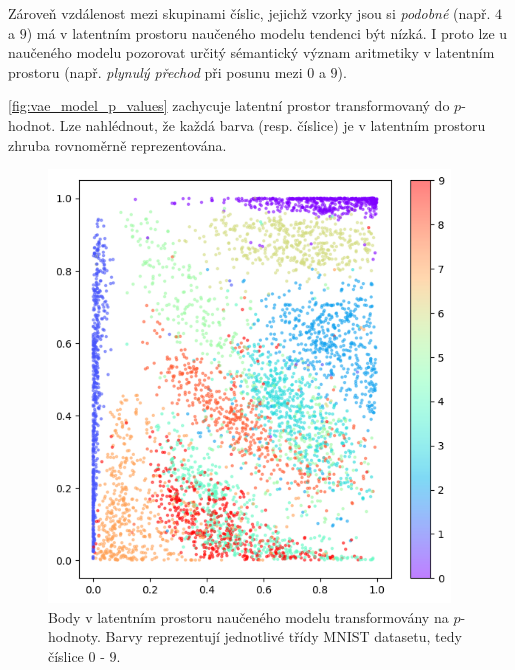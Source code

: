 Zároveň vzdálenost mezi skupinami číslic, jejichž vzorky jsou si \emph{podobné} (např. $4$ a $9$) má v latentním prostoru naučeného modelu tendenci být nízká.
I proto lze u naučeného modelu pozorovat určitý sémantický význam aritmetiky v latentním prostoru (např. \emph{plynulý přechod} při posunu mezi $0$ a $9$).

\autoref{fig:vae_model_p_values} zachycuje latentní prostor transformovaný do $p$-hodnot.
Lze nahlédnout, že každá barva (resp. číslice) je v latentním prostoru zhruba rovnoměrně reprezentována.

\begin{figure}[H]
    \centering
    \includegraphics[width=0.95\textwidth]{figures/vae_latent_space_p_values.png}
    \caption{Body v latentním prostoru naučeného modelu transformovány na $p$-hodnoty. Barvy reprezentují jednotlivé třídy MNIST datasetu, tedy číslice $0$ - $9$. }
    \label{fig:vae_model_p_values}
\end{figure}